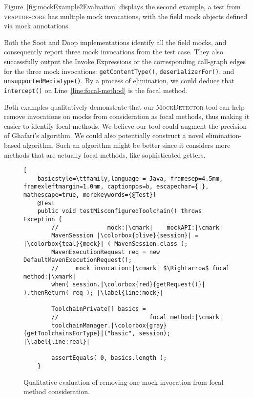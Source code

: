Figure~\ref{fig:mockExample2Evaluation} displays the second example, a test from \textsc{vraptor-core} has multiple mock invocations, with the field mock objects defined via mock annotations. 

Both the Soot and Doop implementations identify all the field mocks, and consequently report three mock invocations from the test case. They also successfully output the Invoke Expressions or the corresponding call-graph edges for the three mock invocations: \texttt{getContentType()}, \texttt{deserializerFor()}, and \texttt{unsupportedMediaType()}. By a process of elimination, we could deduce that \texttt{intercept()} on Line~\ref{line:focal-method} is the focal method. 

Both examples qualitatively demonstrate that our \textsc{MockDetector} tool can help remove invocations on mocks from consideration as focal methods, thus making it easier to identify focal methods. We believe our tool could augment the precision of Ghafari's algorithm. We could also potentially construct a novel elimination-based algorithm. Such an algorithm might be better since it considers more methods that are actually focal methods, like sophisticated getters.

\begin{figure}[h]
	\begin{lstlisting}[
	basicstyle=\ttfamily,language = Java, framesep=4.5mm, framexleftmargin=1.0mm, captionpos=b, escapechar={|}, mathescape=true, morekeywords={@Test}]
	@Test
	public void testMisconfiguredToolchain() throws Exception {
		//        		mock:|\cmark|	 mockAPI:|\cmark|
		MavenSession |\colorbox{olive}{session}| = |\colorbox{teal}{mock}| ( MavenSession.class );
		MavenExecutionRequest req = new DefaultMavenExecutionRequest();
		//     mock invocation:|\cmark| $\Rightarrow$ focal method:|\xmark|
		when( session.|\colorbox{red}{getRequest()}| ).thenReturn( req ); |\label{line:mock}|
		
		ToolchainPrivate[] basics =
		//     					 	focal method:|\cmark|
		toolchainManager.|\colorbox{gray}{getToolchainsForType}|("basic", session); |\label{line:real}|
		
		assertEquals( 0, basics.length );
	}
	\end{lstlisting}
	
	\caption{Qualitative evaluation of removing one mock invocation from focal method consideration.}
	\label{fig:mockExampleEvaluation}
\end{figure}


